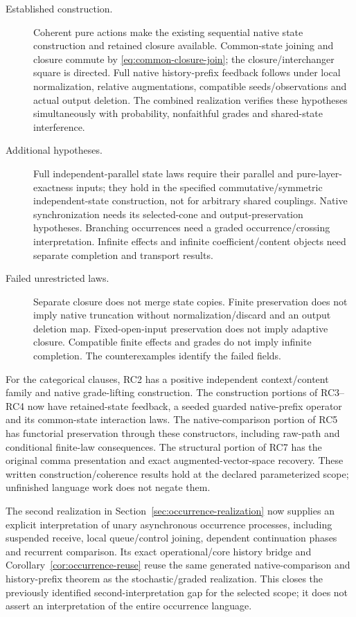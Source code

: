 \documentclass[11pt]{article}
\begin{document}
\begin{description}
\item[Established construction.] Coherent pure actions make the existing sequential native state construction and retained closure available. Common-state joining and closure commute by \eqref{eq:common-closure-join}; the closure/interchanger square is directed. Full native history-prefix feedback follows under local normalization, relative augmentations, compatible seeds/observations and actual output deletion. The combined realization verifies these hypotheses simultaneously with probability, nonfaithful grades and shared-state interference.
\item[Additional hypotheses.] Full independent-parallel state laws require their parallel and pure-layer-exactness inputs; they hold in the specified commutative/symmetric independent-state construction, not for arbitrary shared couplings. Native synchronization needs its selected-cone and output-preservation hypotheses. Branching occurrences need a graded occurrence/crossing interpretation. Infinite effects and infinite coefficient/content objects need separate completion and transport results.
\item[Failed unrestricted laws.] Separate closure does not merge state copies. Finite preservation does not imply native truncation without normalization/discard and an output deletion map. Fixed-open-input preservation does not imply adaptive closure. Compatible finite effects and grades do not imply infinite completion. The counterexamples identify the failed fields.
\end{description}

For the categorical clauses, RC2 has a positive independent context/content family and native grade-lifting construction. The construction portions of RC3--RC4 now have retained-state feedback, a seeded guarded native-prefix operator and its common-state interaction laws. The native-comparison portion of RC5 has functorial preservation through these constructors, including raw-path and conditional finite-law consequences. The structural portion of RC7 has the original comma presentation and exact augmented-vector-space recovery. These written construction/coherence results hold at the declared parameterized scope; unfinished language work does not negate them.

The second realization in Section~\ref{sec:occurrence-realization} now supplies an explicit interpretation of unary asynchronous occurrence processes, including suspended receive, local queue/control joining, dependent continuation phases and recurrent comparison. Its exact operational/core history bridge and Corollary~\ref{cor:occurrence-reuse} reuse the same generated native-comparison and history-prefix theorem as the stochastic/graded realization. This closes the previously identified second-interpretation gap for the selected scope; it does not assert an interpretation of the entire occurrence language.
\end{document}
